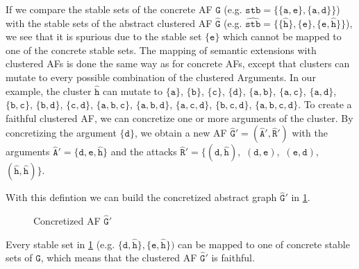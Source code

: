 If we compare the stable sets of the concrete AF $\mathtt{G}$ (e.g. $\mathtt{stb=\{\{a, e\}, \{a, d\}\}}$) with the stable sets of the abstract clustered AF $\mathtt{\hat{G}}$ (e.g. $\mathtt{\hat{stb}=\{\{\hat{h}\}, \{e\}, \{e, \hat{h}\}\}}$), we see that it is spurious due to the stable set $\mathtt{\{e\}}$ which cannot be mapped to one of the concrete stable sets. The mapping of semantic extensions with clustered AFs is done the same way as for concrete AFs, except that clusters can mutate to every possible combination of the clustered Arguments. In our example, the cluster $\mathtt{\hat{h}}$ can mutate to $\mathtt{\{a\}}$, $\mathtt{\{b\}}$, $\mathtt{\{c\}}$, $\mathtt{\{d\}}$, $\mathtt{\{a, b\}}$, $\mathtt{\{a, c\}}$, $\mathtt{\{a, d\}}$, $\mathtt{\{b, c\}}$, $\mathtt{\{b, d\}}$, $\mathtt{\{c, d\}}$, $\mathtt{\{a, b, c\}}$, $\mathtt{\{a, b, d\}}$, $\mathtt{\{a, c, d\}}$, $\mathtt{\{b, c, d\}}$, $\mathtt{\{a, b, c, d\}}$.
To create a faithful clustered AF, we can concretize one or more arguments of the cluster. By concretizing the argument $\mathtt{\{d\}}$, we obtain a new AF $\mathtt{\hat{G}'=(\hat{A}', \hat{R}')}$ with the arguments $\mathtt{\hat{A}'=\{d, e, \hat{h}\}}$ and the attacks $\mathtt{\hat{R}'=\{(d, \hat{h}),}$
$\mathtt{(d, e),}$
$\mathtt{(e, d),}$
$\mathtt{(\hat{h}, \hat{h})\}}$.

With this defintion we can build the concretized abstract graph $\mathtt{\hat{G}'}$ in \cref{af:backgroundClusterExample3}.


\begin{figure}[h]
    \centering
    \caption{Concretized AF $\mathtt{\hat{G}'}$}
    \label{af:backgroundClusterExample3}
\end{figure}

Every stable set in \cref{af:backgroundClusterExample3} (e.g. $\mathtt{\{d, \hat{h}\}, \{e, \hat{h}\}})$ can be mapped to one of concrete stable sets of $\mathtt{G}$, which means that the clustered AF $\mathtt{\hat{G}'}$ is faithful.


